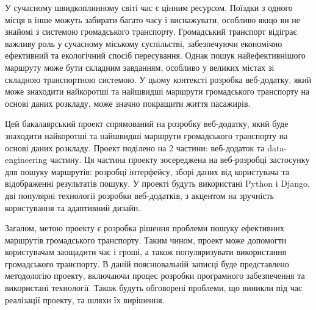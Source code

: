\intro

У сучасному швидкоплинному світі час є цінним ресурсом. Поїздки з одного місця в інше можуть забирати багато часу і виснажувати, особливо якщо ви не знайомі з системою громадського транспорту. Громадський транспорт відіграє важливу роль у сучасному міському суспільстві, забезпечуючи економічно ефективний та екологічний спосіб пересування. Однак пошук найефективнішого маршруту може бути складним завданням, особливо у великих містах зі складною транспортною системою. У цьому контексті розробка веб-додатку, який може знаходити найкоротші та найшвидші маршрути громадського транспорту на основі даних розкладу, може значно покращити життя пасажирів.


Цей бакалаврський проект спрямований на розробку веб-додатку, який буде знаходити найкоротші та найшвидші маршрути громадського транспорту на основі даних розкладу. Проект поділено на 2 частини: веб-додаток та data-engineering частину. Ця частина проекту зосереджена на веб-розробці застосунку для пошуку маршрутів: розробці інтерфейсу, зборі даних від користувача та відображенні результатів пошуку. У проекті будуть використані Python і Django, дві популярні технології розробки веб-додатків, з акцентом на зручність користування та адаптивний дизайн.

Загалом, метою проекту є розробка рішення проблеми пошуку ефективних маршрутів громадського транспорту. Таким чином, проект може допомогти користувачам заощадити час і гроші, а також популяризувати використання громадського транспорту. В даній пояснювальній записці буде представлено методологію проекту, включаючи процес розробки програмного забезпечення та використані технології. Також будуть обговорені проблеми, що виникли під час реалізації проекту, та шляхи їх вирішення.
